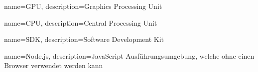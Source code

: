 {
  name={GPU},
  description={{Graphics Processing Unit}}
}

{
  name={CPU},
  description={{Central Processing Unit}}
}

{
  name={SDK},
  description={{Software Development Kit}}
}

{
  name={Node.js},
  description={{JavaScript Ausführungsumgebung, welche ohne einen Browser verwendet werden kann}}
}
